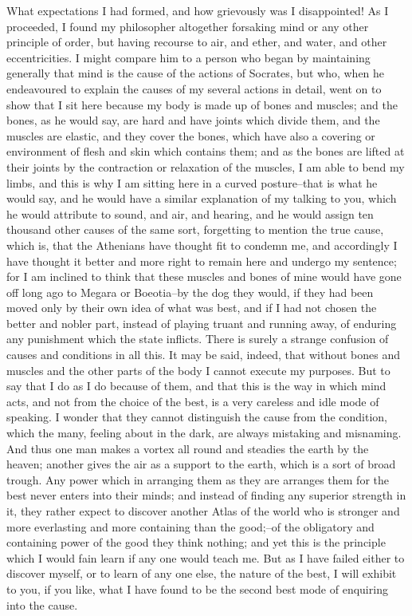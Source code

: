 What expectations I had formed, and how grievously was I disappointed!
As I proceeded, I found my philosopher altogether forsaking mind or any
other principle of order, but having recourse to air, and ether, and
water, and other eccentricities. I might compare him to a person who
began by maintaining generally that mind is the cause of the actions
of Socrates, but who, when he endeavoured to explain the causes of my
several actions in detail, went on to show that I sit here because my
body is made up of bones and muscles; and the bones, as he would say,
are hard and have joints which divide them, and the muscles are elastic,
and they cover the bones, which have also a covering or environment of
flesh and skin which contains them; and as the bones are lifted at their
joints by the contraction or relaxation of the muscles, I am able
to bend my limbs, and this is why I am sitting here in a curved
posture--that is what he would say, and he would have a similar
explanation of my talking to you, which he would attribute to sound, and
air, and hearing, and he would assign ten thousand other causes of the
same sort, forgetting to mention the true cause, which is, that the
Athenians have thought fit to condemn me, and accordingly I have thought
it better and more right to remain here and undergo my sentence; for
I am inclined to think that these muscles and bones of mine would have
gone off long ago to Megara or Boeotia--by the dog they would, if they
had been moved only by their own idea of what was best, and if I had not
chosen the better and nobler part, instead of playing truant and running
away, of enduring any punishment which the state inflicts. There is
surely a strange confusion of causes and conditions in all this. It may
be said, indeed, that without bones and muscles and the other parts
of the body I cannot execute my purposes. But to say that I do as I do
because of them, and that this is the way in which mind acts, and
not from the choice of the best, is a very careless and idle mode of
speaking. I wonder that they cannot distinguish the cause from the
condition, which the many, feeling about in the dark, are always
mistaking and misnaming. And thus one man makes a vortex all round and
steadies the earth by the heaven; another gives the air as a support to
the earth, which is a sort of broad trough. Any power which in arranging
them as they are arranges them for the best never enters into their
minds; and instead of finding any superior strength in it, they rather
expect to discover another Atlas of the world who is stronger and more
everlasting and more containing than the good;--of the obligatory and
containing power of the good they think nothing; and yet this is the
principle which I would fain learn if any one would teach me. But as I
have failed either to discover myself, or to learn of any one else,
the nature of the best, I will exhibit to you, if you like, what I have
found to be the second best mode of enquiring into the cause.

